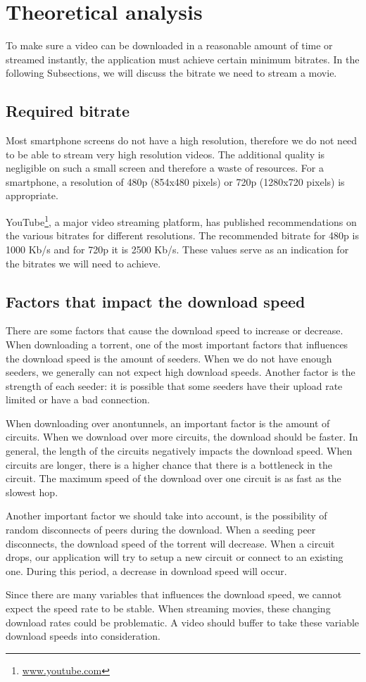 \section{Theoretical analysis}
\label{sec:experiments:theoretical}
	To make sure a video can be downloaded in a reasonable amount of time or streamed instantly, the application must achieve certain minimum bitrates. In the following Subsections, we will discuss the bitrate we need to stream a movie.
	
	\subsection{Required bitrate}
	\label{sec:experiments:theoretical:bitrates}
		Most smartphone screens do not have a high resolution, therefore we do not need to be able to stream very high resolution videos. The additional quality is negligible on such a small screen and therefore a waste of resources. For a smartphone, a resolution of 480p (854x480 pixels) or 720p (1280x720 pixels) is appropriate.
		
		YouTube\footnote{\href{https://www.youtube.com/}{www.youtube.com}}, a major video streaming platform, has published recommendations on the various bitrates for different resolutions\cite{googlebitrates}. The recommended bitrate for 480p is 1000 Kb/s and for 720p it is 2500 Kb/s. These values serve as an indication for the bitrates we will need to achieve. 
		
	\subsection{Factors that impact the download speed}
		There are some factors that cause the download speed to increase or decrease. When downloading a torrent, one of the most important factors that influences the download speed is the amount of seeders. When we do not have enough seeders, we generally can not expect high download speeds. Another factor is the strength of each seeder: it is possible that some seeders have their upload rate limited or have a bad connection.
		
		When downloading over anontunnels, an important factor is the amount of circuits. When we download over more circuits, the download should be faster. In general, the length of the circuits negatively impacts the download speed. When circuits are longer, there is a higher chance that there is a bottleneck in the circuit. The maximum speed of the download over one circuit is as fast as the slowest hop.
		
		Another important factor we should take into account, is the possibility of random disconnects of peers during the download. When a seeding peer disconnects, the download speed of the torrent will decrease. When a circuit drops, our application will try to setup a new circuit or connect to an existing one. During this period, a decrease in download speed will occur.
		
		Since there are many variables that influences the download speed, we cannot expect the speed rate to be stable. When streaming movies, these changing download rates could be problematic. A video should buffer to take these variable download speeds into consideration.